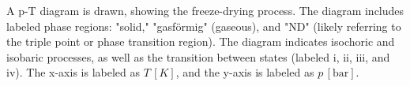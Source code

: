A p-T diagram is drawn, showing the freeze-drying process. The diagram includes labeled phase regions: "solid," "gasförmig" (gaseous), and "ND" (likely referring to the triple point or phase transition region). The diagram indicates isochoric and isobaric processes, as well as the transition between states (labeled i, ii, iii, and iv). The x-axis is labeled as \( T \, [K] \), and the y-axis is labeled as \( p \, [\text{bar}] \).